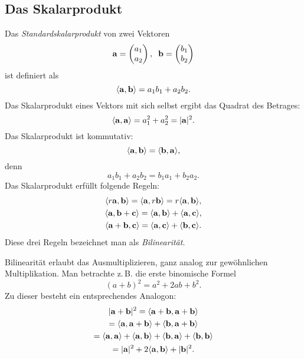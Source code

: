 \subsection{Das Skalarprodukt}

Das \emph{Standardskalarprodukt} von zwei Vektoren%
\[\mathbf{a} = \begin{pmatrix}a_1\\ a_2\end{pmatrix},\;\;
\mathbf{b} = \begin{pmatrix}b_1\\ b_2\end{pmatrix}\]
ist definiert als
\begin{equation}
\langle\mathbf{a},\mathbf{b}\rangle = a_1b_1+a_2b_2.
\end{equation}
Das Skalarprodukt eines Vektors mit sich selbst
ergibt das Quadrat des Betrages:
\begin{equation}
\langle\mathbf{a},\mathbf{a}\rangle = a_1^2+a_2^2 = |\mathbf{a}|^2.
\end{equation}
Das Skalarprodukt ist kommutativ:
\begin{equation}
\langle\mathbf{a},\mathbf{b}\rangle
= \langle\mathbf{b},\mathbf{a}\rangle,
\end{equation}
denn
\[a_1 b_1 + a_2 b_2 = b_1 a_1 + b_2 a_2.\]
Das Skalarprodukt erfüllt folgende Regeln:
\begin{gather}
\langle r\mathbf{a},\mathbf{b}\rangle = \langle\mathbf{a},r\mathbf{b}\rangle
= r\langle\mathbf{a},\mathbf{b}\rangle,\\
\langle\mathbf{a},\mathbf{b}+\mathbf{c}\rangle
= \langle\mathbf{a},\mathbf{b}\rangle+\langle\mathbf{a},\mathbf{c}\rangle,\\
\langle\mathbf{a}+\mathbf{b},\mathbf{c}\rangle
= \langle\mathbf{a},\mathbf{c}\rangle+\langle\mathbf{b},\mathbf{c}\rangle.
\end{gather}
Diese drei Regeln bezeichnet man als \emph{Bilinearität}.

Bilinearität erlaubt das Ausmultiplizieren, ganz analog zur
gewöhnlichen Multiplikation. Man betrachte z.\,B. die
erste binomische Formel
\[(a+b)^2 = a^2+2ab+b^2.\]
Zu dieser besteht ein entsprechendes Analogon:
\begin{gather*}
|\mathbf{a}+\mathbf{b}|^2
= \langle\mathbf{a}+\mathbf{b},\mathbf{a}+\mathbf{b}\rangle\\
= \langle\mathbf{a},\mathbf{a}+\mathbf{b}\rangle
+ \langle\mathbf{b},\mathbf{a}+\mathbf{b}\rangle\\
= \langle\mathbf{a},\mathbf{a}\rangle
+ \langle\mathbf{a},\mathbf{b}\rangle
+ \langle\mathbf{b},\mathbf{a}\rangle
+ \langle\mathbf{b},\mathbf{b}\rangle\\
= |\mathbf{a}|^2 + 2\langle\mathbf{a},\mathbf{b}\rangle + |\mathbf{b}|^2.
\end{gather*}

